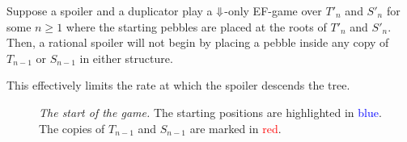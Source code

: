 \documentclass[a4paper,UKenglish,cleveref, autoref, thm-restate, numberwithinsect]{lipics-v2021}
\def\Darrow{\ensuremath\mathord{\Downarrow}}
\begin{document}
%
\begin{lemma}
    \label{lemma:speedbreaker}
    Suppose a spoiler and a duplicator play a $\Darrow$-only EF-game over $T'_n$ and $S'_n$ for some $n \geq 1$ where the starting pebbles are placed at the roots of $T'_n$ and $S'_n$. Then, a rational spoiler will not begin by placing a pebble inside any copy of $T_{n - 1}$ or $S_{n - 1}$ in either structure.
    \begin{remark*}
        This effectively limits the rate at which the spoiler descends the tree.
    \end{remark*}
\end{lemma}
\begin{figure}
    \centering
    \caption{\emph{The start of the game.} The starting positions are highlighted in \textcolor{blue}{blue}. The copies of $T_{n-1}$ and $S_{n-1}$ are marked in \textcolor{red}{red}.}
    \label{SpeedbreakerProofStartFig}
\end{figure}
\end{document}
